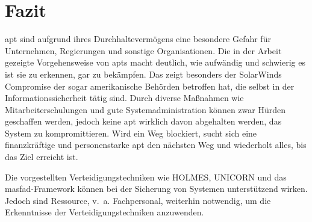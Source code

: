 \documentclass[conference]{IEEEtran}
\begin{document}
\section{Fazit}
\ac{apt} sind aufgrund ihres Durchhaltevermögens eine besondere Gefahr für Unternehmen, Regierungen und sonstige Organisationen.
Die in der Arbeit gezeigte Vorgehensweise von \acp{apt} macht deutlich, wie aufwändig und schwierig es ist sie zu erkennen, gar zu bekämpfen.
Das zeigt besonders der SolarWinds Compromise der sogar amerikanische Behörden betroffen hat, die selbst in der Informationssicherheit tätig sind.
Durch diverse Maßnahmen wie Mitarbeiterschulungen und gute Systemadministration können zwar Hürden geschaffen werden, jedoch keine \ac{apt} wirklich davon abgehalten werden, das System zu kompromittieren.
Wird ein Weg blockiert, sucht sich eine finanzkräftige und personenstarke \ac{apt} den nächsten Weg und wiederholt alles, bis das Ziel erreicht ist.

Die vorgestellten Verteidigungstechniken wie HOLMES, UNICORN und das \ac{masfad}-Framework können bei der Sicherung von Systemen unterstützend wirken.
Jedoch sind Ressource, v.~a. Fachpersonal, weiterhin notwendig, um die Erkenntnisse der Verteidigungstechniken anzuwenden.

\balance


\end{document}
